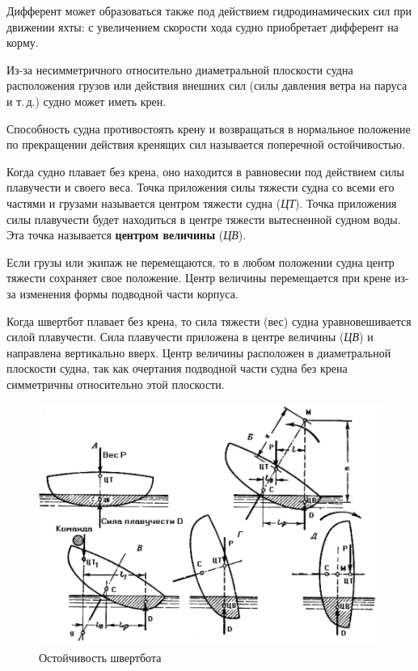 \documentclass[a4paper, 12pt, twoside, final]{scrbook}
\begin{document}
Дифферент может образоваться также под действием гидродинамических сил при движении яхты: с увеличением скорости хода судно приобретает дифферент на корму.

Из-за несимметричного относительно диаметральной плоскости судна расположения грузов или действия внешних сил (силы давления ветра на паруса и т.\,д.) судно может иметь крен.

Способность судна противостоять крену и возвращаться в нормальное положение по прекращении действия кренящих сил называется поперечной остойчивостью.

Когда судно плавает без крена, оно находится в равновесии под действием силы плавучести и своего веса. Точка приложения силы тяжести судна со всеми его частями и грузами называется центром тяжести судна (\textit{ЦТ}). Точка приложения силы плавучести будет находиться в центре тяжести вытесненной судном воды. Эта точка называется \textbf{центром величины} (\textit{ЦВ}).

Если грузы или экипаж не перемещаются, то в любом положении судна центр тяжести сохраняет свое положение. Центр величины перемещается при крене из-за изменения формы подводной части корпуса.

Когда швертбот плавает без крена, то сила тяжести (вес) судна уравновешивается силой плавучести. Сила плавучести приложена в центре величины (\textit{ЦВ}) и направлена вертикально вверх. Центр величины расположен в диаметральной плоскости судна, так как очертания подводной части судна без крена симметричны относительно этой плоскости.

\begin{figure}[htbp]
   \centering
   \includegraphics{pics/78_Ostojchivost_shvertbota} %
   \caption{Остойчивость швертбота}
   \label{fig:78}
\end{figure}
\end{document}
